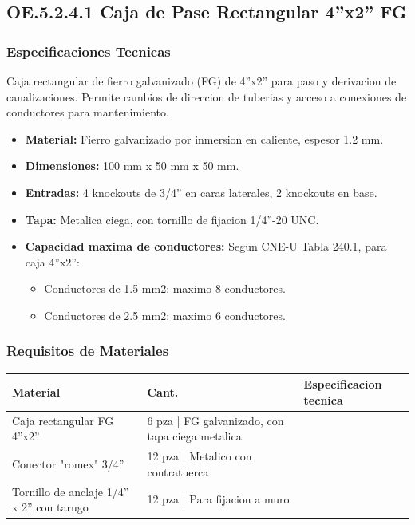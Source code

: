\subsection{OE.5.2.4.1 Caja de Pase Rectangular 4''x2'' FG}

\subsubsection{Especificaciones Tecnicas}

Caja rectangular de fierro galvanizado (FG) de 4''x2'' para paso y derivacion de canalizaciones. Permite cambios de direccion de tuberias y acceso a conexiones de conductores para mantenimiento.

\begin{itemize}[nosep]
  \item \textbf{Material:} Fierro galvanizado por inmersion en caliente, espesor 1.2 mm.
  \item \textbf{Dimensiones:} 100 mm x 50 mm x 50 mm.
  \item \textbf{Entradas:} 4 knockouts de 3/4'' en caras laterales, 2 knockouts en base.
  \item \textbf{Tapa:} Metalica ciega, con tornillo de fijacion 1/4''-20 UNC.
  \item \textbf{Capacidad maxima de conductores:} Segun CNE-U Tabla 240.1, para caja 4''x2'':
  \begin{itemize}
    \item Conductores de 1.5 mm2: maximo 8 conductores.
    \item Conductores de 2.5 mm2: maximo 6 conductores.
  \end{itemize}
\end{itemize}

\subsubsection{Requisitos de Materiales}

\begin{longtable}{L{5.0cm} L{2.0cm} L{7.5cm}}
\toprule
\textbf{Material} & \textbf{Cant.} & \textbf{Especificacion tecnica} \\
\midrule
Caja rectangular FG 4''x2'' & 6 pza | FG galvanizado, con tapa ciega metalica \\
Conector "romex" 3/4'' & 12 pza | Metalico con contratuerca \\
Tornillo de anclaje 1/4'' x 2'' con tarugo & 12 pza | Para fijacion a muro \\
\bottomrule
\end{longtable}

